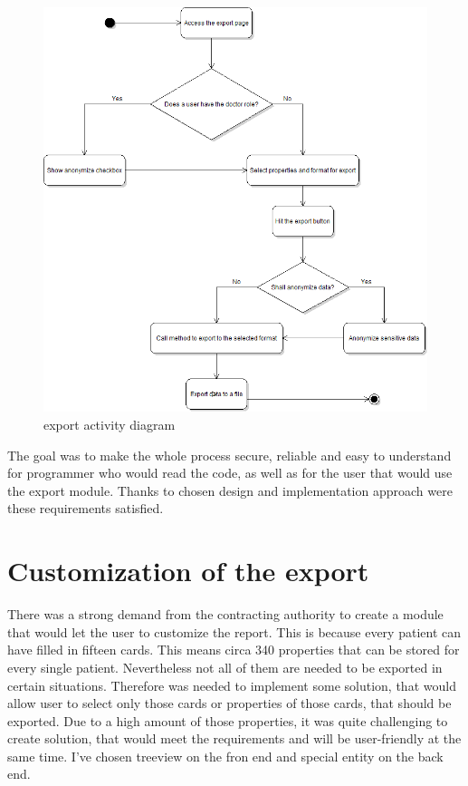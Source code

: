 \documentclass[thesis=B,english]{FITthesis}[2012/10/20]
\begin{document}
\begin{figure}\centering
\includegraphics[width=0.5\paperwidth]{exportDiagram}
		\caption{export activity diagram}\label{fig:logo}
\end{figure}

The goal was to make the whole process secure, reliable and easy to understand for programmer who would read the code, as well as for the user that would use the export module. Thanks to chosen design and implementation approach were these requirements satisfied.
\section{Customization of the export}
There was a strong demand from the contracting authority to create a module that would let the user to customize the report. This is because every patient can have filled in fifteen cards. This means circa 340 properties that can be stored for every single patient. Nevertheless not all of them are needed to be exported in certain situations. Therefore was needed to implement some solution, that would allow user to select only those cards or properties of those cards, that should be exported.
Due to a high amount of those properties, it was quite challenging to create solution, that would meet the requirements and will be user-friendly at the same time. I've chosen treeview on the fron end and special entity on the back end.
\end{document}
